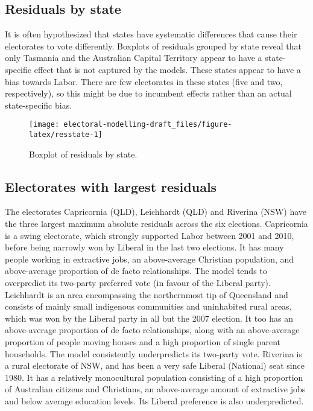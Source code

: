 \documentclass[openany]{book}
\begin{document}
\hypertarget{residuals-by-state}{%
\subsection{Residuals by state}\label{residuals-by-state}}

It is often hypothesized that states have systematic differences that cause their electorates to vote differently. Boxplots of residuals grouped by state reveal that only Tasmania and the Australian Capital Territory appear to have a state-specific effect that is not captured by the models. These states appear to have a bias towards Labor. There are few electorates in these states (five and two, respectively), so this might be due to incumbent effects rather than an actual state-specific bias.

\begin{figure}[h]

{\centering \texttt{[image: electoral-modelling-draft\_files/figure-latex/resstate-1]} 

}

\caption{Boxplot of residuals by state.}\label{fig:resstate}
\end{figure}

\hypertarget{electorates-with-largest-residuals}{%
\subsection{Electorates with largest residuals}\label{electorates-with-largest-residuals}}

The electorates Capricornia (QLD), Leichhardt (QLD) and Riverina (NSW) have the three largest maximum absolute residuals across the six elections. Capricornia is a swing electorate, which strongly supported Labor between 2001 and 2010, before being narrowly won by Liberal in the last two elections. It has many people working in extractive jobs, an above-average Christian population, and above-average proportion of de facto relationships. The model tends to overpredict its two-party preferred vote (in favour of the Liberal party). Leichhardt is an area encompassing the northernmost tip of Queensland and consists of mainly small indigenous communities and uninhabited rural areas, which was won by the Liberal party in all but the 2007 election. It too has an above-average proportion of de facto relationships, along with an above-average proportion of people moving houses and a high proportion of single parent households. The model consistently underpredicts its two-party vote. Riverina is a rural electorate of NSW, and has been a very safe Liberal (National) seat since 1980. It has a relatively monocultural population consisting of a high proportion of Australian citizens and Christians, an above-average amount of extractive jobs and below average education levels. Its Liberal preference is also underpredicted.
\end{document}

